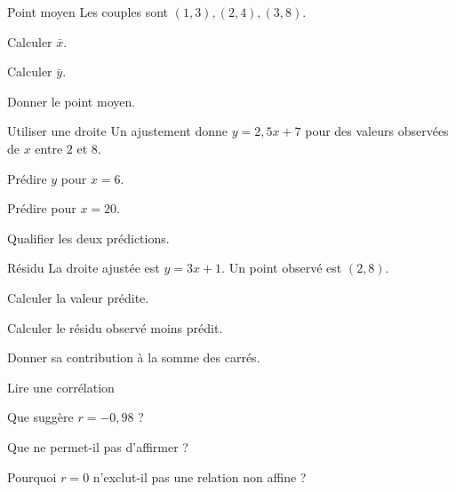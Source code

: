\exercices
{}
\begingroup\renewcommand{\otBesoinPlace}[1]{}\begin{minipage}{\linewidth}
\begin{exercice}[1]{Point moyen}
Les couples sont $(1,3),(2,4),(3,8)$.
\begin{questions}
\item Calculer $\bar x$.
\item Calculer $\bar y$.
\item Donner le point moyen.
\end{questions}
\end{exercice}
\begin{exercice}[1]{Utiliser une droite}
Un ajustement donne $y=2{,}5x+7$ pour des valeurs observées de $x$ entre $2$ et $8$.
\begin{questions}
\item Prédire $y$ pour $x=6$.
\item Prédire pour $x=20$.
\item Qualifier les deux prédictions.
\end{questions}
\end{exercice}
\begin{exercice}[1]{Résidu}
La droite ajustée est $y=3x+1$. Un point observé est $(2,8)$.
\begin{questions}
\item Calculer la valeur prédite.
\item Calculer le résidu observé moins prédit.
\item Donner sa contribution à la somme des carrés.
\end{questions}
\end{exercice}
\begin{exercice}[1]{Lire une corrélation}

\begin{questions}
\item Que suggère $r=-0{,}98$ ?
\item Que ne permet-il pas d’affirmer ?
\item Pourquoi $r=0$ n’exclut-il pas une relation non affine ?
\end{questions}
\end{exercice}
\end{minipage}\endgroup
\clearpage
{}
